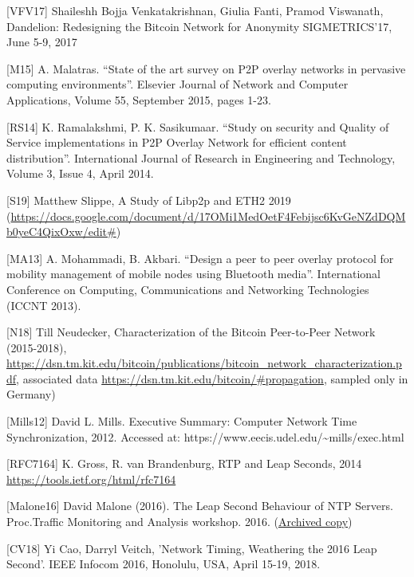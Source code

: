 \documentclass[]{article}
\begin{document}
{[}VFV17{]} Shaileshh Bojja Venkatakrishnan, Giulia Fanti, Pramod
Viswanath, Dandelion: Redesigning the Bitcoin Network for Anonymity
SIGMETRICS'17, June 5-9, 2017

{[}M15{]} A. Malatras. ``State of the art survey on P2P overlay networks
in pervasive computing environments''. Elsevier Journal of Network and
Computer Applications, Volume 55, September 2015, pages 1-23.

{[}RS14{]} K. Ramalakshmi, P. K. Sasikumaar. ``Study on security and
Quality of Service implementations in P2P Overlay Network for efficient
content distribution''. International Journal of Research in Engineering
and Technology, Volume 3, Issue 4, April 2014.

{[}S19{]} Matthew Slippe, A Study of Libp2p and ETH2 2019
(\href{https://docs.google.com/document/d/17OMi1MedOetF4Febijsc6KvGeNZdDQMb0yeC4QixOxw/edit\#}{{https://docs.google.com/document/d/17OMi1MedOetF4Febijsc6KvGeNZdDQMb0yeC4QixOxw/edit\#}})

{[}MA13{]} A. Mohammadi, B. Akbari. ``Design a peer to peer overlay
protocol for mobility management of mobile nodes using Bluetooth
media''. International Conference on Computing, Communications and
Networking Technologies (ICCNT 2013).

{[}N18{]} Till Neudecker, Characterization of the Bitcoin Peer-to-Peer
Network (2015-2018),
\href{https://dsn.tm.kit.edu/bitcoin/publications/bitcoin_network_characterization.pdf}{{https://dsn.tm.kit.edu/bitcoin/publications/bitcoin\_network\_characterization.pdf}},
associated data
\href{https://dsn.tm.kit.edu/bitcoin/\#propagation}{{https://dsn.tm.kit.edu/bitcoin/\#propagation}},
sampled only in Germany)

{[}Mills12{]} David L. Mills. Executive Summary: Computer Network Time
Synchronization, 2012. Accessed at:
https://www.eecis.udel.edu/\textasciitilde{}mills/exec.html

{[}RFC7164{]} K. Gross, R. van Brandenburg, RTP and Leap Seconds, 2014
\href{https://tools.ietf.org/html/rfc7164}{{https://tools.ietf.org/html/rfc7164}}

{[}Malone16{]} David Malone (2016). The Leap Second Behaviour of NTP
Servers. Proc.Traffic Monitoring and Analysis workshop. 2016.
(\href{https://web.archive.org/web/20161023201948/http://tma.ifip.org/2016/papers/tma2016-final27.pdf}{{Archived
copy}})

{[}CV18{]} Yi Cao, Darryl Veitch, 'Network Timing, Weathering the 2016
Leap Second'. IEEE Infocom 2016, Honolulu, USA, April 15-19, 2018.
\end{document}
